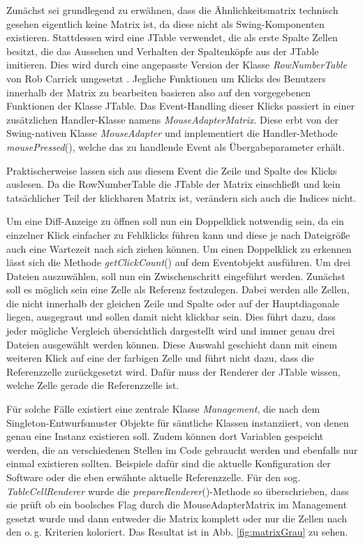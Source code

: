 Zunächst sei grundlegend zu erwähnen, dass die Ähnlichkeitsmatrix technisch gesehen eigentlich keine Matrix ist, da diese nicht als Swing-Komponenten existieren. Stattdessen wird eine JTable verwendet, die als erste Spalte Zellen besitzt, die das Aussehen und Verhalten der Spaltenköpfe aus der JTable imitieren. Dies wird durch eine angepasste Version der Klasse \emph{RowNumberTable} von Rob Carrick umgesetzt \autocite{rowNumTable}. Jegliche Funktionen um Klicks des Benutzers innerhalb der Matrix zu bearbeiten basieren also auf den vorgegebenen Funktionen der Klasse JTable. Das Event-Handling dieser Klicks passiert in einer zusätzlichen Handler-Klasse namens \emph{MouseAdapterMatrix}. Diese erbt von der Swing-nativen Klasse \emph{MouseAdapter} und implementiert die Handler-Methode \emph{mousePressed}(), welche das zu handlende Event als Übergabeparameter erhält. 

Praktischerweise lassen sich aus diesem Event die Zeile und Spalte des Klicks auslesen. Da die RowNumberTable die JTable der Matrix einschließt und kein tatsächlicher Teil der klickbaren Matrix ist, verändern sich auch die Indices nicht. 

Um eine Diff-Anzeige zu öffnen soll nun ein Doppelklick notwendig sein, da ein einzelner Klick einfacher zu Fehlklicks führen kann und diese je nach Dateigröße auch eine Wartezeit nach sich ziehen können. Um einen Doppelklick zu erkennen lässt sich die Methode \emph{getClickCount}() auf dem Eventobjekt ausführen. Um drei Dateien auszuwählen, soll nun ein Zwischenschritt eingeführt werden. Zunächst soll es möglich sein eine Zelle als Referenz festzulegen. Dabei werden alle Zellen, die nicht innerhalb der gleichen Zeile und Spalte oder auf der Hauptdiagonale liegen, ausgegraut und sollen damit nicht klickbar sein. Dies führt dazu, dass jeder mögliche Vergleich übersichtlich dargestellt wird und immer genau drei Dateien ausgewählt werden können. Diese Auswahl geschieht dann mit einem weiteren Klick auf eine der farbigen Zelle und führt nicht dazu, dass die Referenzzelle zurückgesetzt wird. Dafür muss der Renderer der JTable wissen, welche Zelle gerade die Referenzzelle ist.

Für solche Fälle existiert eine zentrale Klasse \emph{Management}, die nach dem Singleton-Entwurfsmuster Objekte für sämtliche Klassen instanziiert, von denen genau eine Instanz existieren soll. Zudem können dort Variablen gespeicht werden, die an verschiedenen Stellen im Code gebraucht werden und ebenfalls nur einmal existieren sollten. Beispiele dafür sind die aktuelle Konfiguration der Software oder die eben erwähnte aktuelle Referenzzelle. Für den sog. \emph{TableCellRenderer} wurde die \emph{prepareRenderer}()-Methode so überschrieben, dass sie prüft ob ein boolsches Flag durch die MouseAdapterMatrix im Management gesetzt wurde und dann entweder die Matrix komplett oder nur die Zellen nach den o.\,g. Kriterien koloriert. Das Resultat ist in Abb. \ref{fig:matrixGrau} zu sehen.

